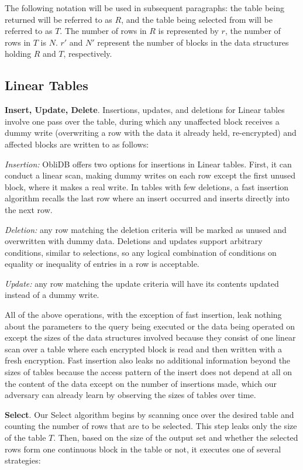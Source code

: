 \documentclass[letterpaper,twocolumn,10pt]{article}
\def\name/{ObliDB}
\begin{document}
The following notation will be used in subsequent paragraphs: the table being returned will be referred to as $R$, and the table being selected from will be referred to as $T$. The number of rows in $R$ is represented by $r$, the number of rows in $T$ is $N$. $r'$ and $N'$ represent the number of blocks in the data structures holding $R$ and $T$, respectively.

\subsection{Linear Tables}
  \noindent \textbf{Insert, Update, Delete}.
Insertions, updates, and deletions for Linear tables involve one pass over the table, during which any unaffected block receives a dummy write (overwriting a row with the data it already held, re-encrypted) and affected blocks are written to as follows:

\emph{Insertion:} \name/ offers two options for insertions in Linear tables. First, it can conduct a linear scan, making dummy writes on each row except the first unused block, where it makes a real write. In tables with few deletions, a fast insertion algorithm recalls the last row where an insert occurred and inserts directly into the next row.

\emph{Deletion:} any row matching the deletion criteria will be marked as unused and overwritten with dummy data. Deletions and updates support arbitrary conditions, similar to selections, so any logical combination of conditions on equality or inequality of entries in a row is acceptable.

\emph{Update:} any row matching the update criteria will have its contents updated instead of a dummy write.


All of the above operations, with the exception of fast insertion, leak nothing about the parameters to the query being executed or the data being operated on except the sizes of the data structures involved because they consist of one linear scan over a table where each encrypted block is read and then written with a fresh encryption. Fast insertion also leaks no additional information beyond the sizes of tables because the access pattern of the insert does not depend at all on the content of the data except on the number of insertions made, which our adversary can already learn by observing the sizes of tables over time.

  \noindent \textbf{Select}.
Our Select algorithm begins by scanning once over the desired table and counting the number of rows that are to be selected. This step leaks only the size of the table $T$. Then, based on the size of the output set and whether the selected rows form one continuous block in the table or not, it executes one of several strategies:
\end{document}
